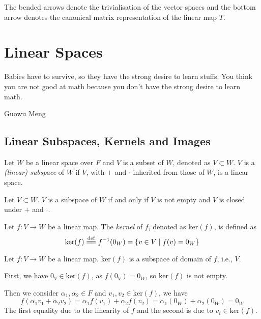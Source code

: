 \documentclass[
	11pt, %
	fleqn, %
	a4paper, %
]{LegrandOrangeBook}
\renewcommand{\ker}[1]{\text{ker}(#1)} %
\begin{document}
The bended arrows denote the trivialisation of the vector spaces and the bottom arrow denotes the canonical matrix representation of the linear map $T$.

\chapter{Linear Spaces}

\epigraph{Babies have to survive, so they have the strong desire to learn stuffs. You think you are not good at math because you don't have the strong desire to learn math.}{Guowu Meng}

\section{Linear Subspaces, Kernels and Images}

\begin{definition}
    Let $W$ be a linear space over $F$ and $V$ is a subset of $W$, denoted as $V \subset W$. $V$ is a \emph{(linear) subspace} of $W$ if $V$, with $+$ and $\cdot$ inherited from those of $W$, is a linear space.
\end{definition}

\begin{proposition}
    Let $V \subset W$. $V$ is a subspace of $W$ if and only if $V$ is not empty and $V$ is closed under $+$ and $\cdot$.
\end{proposition}

\begin{definition}[Kernels]
    Let $f : V \to W$ be a linear map. The \emph{kernel} of $f$, denoted as $\ker f$, is defined as 
    \[
        \ker f \overset{\text{def}}{=\joinrel=} f^{-1}(0_W) = \{ v \in V \mid f(v) = 0_W \}
    \]
\end{definition}

\begin{example}
    Let $f : V \to W$ be a linear map. $\ker f$ is a subspace of domain of $f$, i.e., $V$.
    
    First, we have $0_V \in \ker f$, as $f(0_V) = 0_W$, so $\ker f$ is not empty.

    Then we consider $\alpha_1, \alpha_2 \in F$ and $v_1, v_2 \in \ker f$, we have
    \[
        f(\alpha_1 v_1 + \alpha_2 v_2) = \alpha_1 f(v_1) + \alpha_2 f(v_2) = \alpha_1 (0_W) + \alpha_2 (0_W) = 0_W
    \]
    The first equality due to the linearity of $f$ and the second is due to $v_i \in \ker f$.
\end{example}
\end{document}
